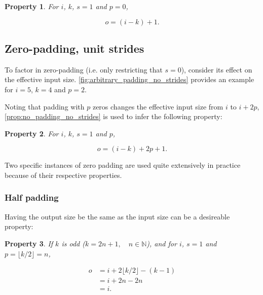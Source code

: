 \documentclass{article}
\newtheorem{prop}{Property}
\begin{document}
\begin{prop}\label{prop:no_padding_no_strides}
For $i$, $k$, $s = 1$ and $p = 0$,

\begin{equation}
    o = (i - k) + 1.
\end{equation}
\end{prop}

\subsection{Zero-padding, unit strides}

To factor in zero-padding (i.e. only restricting that $s = 0$), consider its
effect on the effective input size. \autoref{fig:arbitrary_padding_no_strides}
provides an example for $i = 5$, $k = 4$ and $p = 2$.

Noting that padding with $p$ zeros changes the effective input size from $i$ to
$i + 2p$, \autoref{prop:no_padding_no_strides} is used to infer the following
property:

\begin{prop}\label{prop:arbitrary_padding_no_strides}
For $i$, $k$, $s = 1$ and $p$,

\begin{equation}
    o = (i - k) + 2p + 1.
\end{equation}
\end{prop}

Two specific instances of zero padding are used quite extensively in practice
because of their respective properties.

\subsubsection{Half padding}

Having the output size be the same as the input size can be a desireable
property:

\begin{prop}\label{prop:same_padding_no_strides}
If $k$ is odd ($k = 2n + 1, \quad n \in \mathbb{N}$), and for $i$, $s = 1$ and
$p = \lfloor k / 2 \rfloor = n$,

\begin{equation}
\begin{split}
    o &= i + 2 \lfloor k / 2 \rfloor - (k - 1) \\
      &= i + 2n - 2n \\
      &= i.
\end{split}
\end{equation}
\end{prop}
\end{document}
